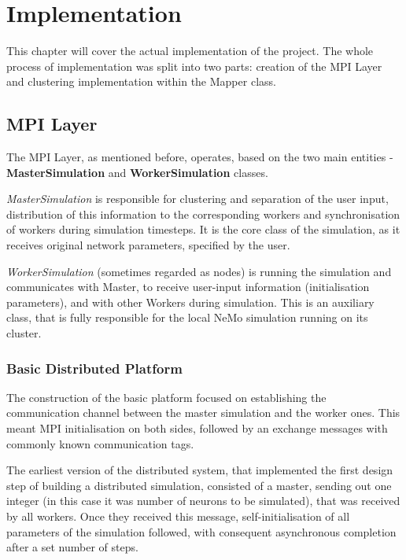 \chapter{Implementation}

This chapter will cover the actual implementation of the project. The whole process of implementation was split into two parts: creation of the MPI Layer and clustering implementation within the Mapper class.

\section{MPI Layer}

The MPI Layer, as mentioned before, operates, based on the two main entities - \textbf{MasterSimulation} and \textbf{WorkerSimulation} classes.

\emph{MasterSimulation} is responsible for clustering and separation of the user input, distribution of this information to the corresponding workers and synchronisation of workers during simulation timesteps. It is the core class of the simulation, as it receives original network parameters, specified by the user.

\emph{WorkerSimulation} (sometimes regarded as nodes) is running the simulation and communicates with Master, to receive user-input information (initialisation parameters), and with other Workers during simulation. This is an auxiliary class, that is fully responsible for the local NeMo simulation running on its cluster.

\subsection{Basic Distributed Platform}

The construction of the basic platform focused on establishing the communication channel between the master simulation and the worker ones. This meant MPI initialisation on both sides, followed by an exchange messages with commonly known communication tags.

The earliest version of the distributed system, that implemented the first design step of building a distributed simulation, consisted of a master, sending out one integer (in this case it was number of neurons to be simulated), that was received by all workers. Once they received this message, self-initialisation of all parameters of the simulation followed, with consequent asynchronous completion after a set number of steps.

